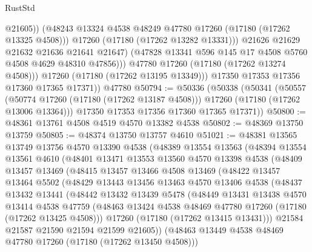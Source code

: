 \begin{lexlean}{RustStd}
\begin{coremodule}
                        @21605))
                    (@48243 @13324 @4538 @48249 @47780 @17260 (@17180 (@17262 @13325 @4508)))
                    @17260
                    (@17180 (@17262 @13282 @13331)))
                  @21626
                  @21629
                  @21632
                  @21636
                  @21641
                  @21647)
                (@47828 @13341 @596 @145 @17 @4508 @5760 @4508 @4629 @48310 @47856)))
            @47780
            @17260
            (@17180 (@17262 @13274 @4508)))
          @17260
          (@17180 (@17262 @13195 @13349)))
        @17350
        @17353
        @17356
        @17360
        @17365
        @17371))
    @47780
@50794 := @50336
    (@50338
      (@50341
        (@50557
          (@50774 @17260 (@17180 (@17262 @13187 @4508)))
          @17260
          (@17180 (@17262 @13006 @13364)))
        @17350
        @17353
        @17356
        @17360
        @17365
        @17371))
@50800 := @48361 @13761 @4508 @4519 @4570 @13382 @4538
@50802 := @48369 @13750 @13759
@50805 := @48374 @13750 @13757 @4610
@51021 := @48381
    @13565
    @13749
    @13756
    @4570
    @13390
    @4538
    (@48389
      @13554
      @13563
      (@48394
        @13554
        @13561
        @4610
        (@48401
          @13471
          @13553
          @13560
          @4570
          @13398
          @4538
          (@48409
            @13457
            @13469
            (@48415
              @13457
              @13466
              @4508
              @13469
              (@48422
                @13457
                @13464
                @5502
                (@48429
                  @13443
                  @13456
                  @13463
                  @4570
                  @13406
                  @4538
                  (@48437
                    @13432
                    @13441
                    (@48442
                      @13432
                      @13439
                      @5478
                      (@48449
                        @13431
                        @13438
                        @4570
                        @13414
                        @4538
                        @47759
                        (@48463 @13424 @4538 @48469 @47780 @17260 (@17180 (@17262 @13425 @4508)))
                        @17260
                        (@17180 (@17262 @13415 @13431)))
                      @21584
                      @21587
                      @21590
                      @21594
                      @21599
                      @21605))
                  (@48463 @13449 @4538 @48469 @47780 @17260 (@17180 (@17262 @13450 @4508)))

\end{coremodule}
\end{lexlean}
